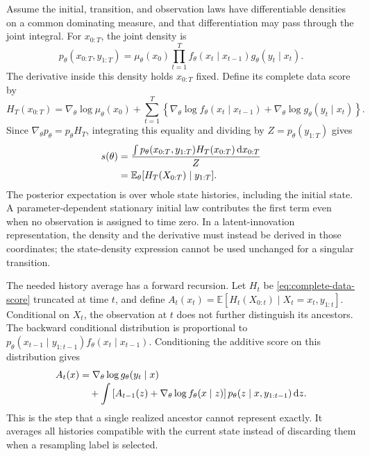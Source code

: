 \documentclass[11pt]{article}
\newcommand{\dd}{\mathrm{d}}
\begin{document}
Assume the initial, transition, and observation laws have differentiable
densities on a common dominating measure, and that differentiation may pass
through the joint integral. For $x_{0:T}$, the joint density is
\begin{equation}
 p_\theta(x_{0:T},y_{1:T})
 =\mu_\theta(x_0)\prod_{t=1}^T
       f_\theta(x_t\mid x_{t-1})g_\theta(y_t\mid x_t).
 \label{eq:joint-model-density}
\end{equation}
The derivative inside this density holds $x_{0:T}$ fixed. Define its complete
data score by
\begin{equation}
 H_T(x_{0:T})=\nabla_\theta\log\mu_\theta(x_0)
 +\sum_{t=1}^T\left\{
    \nabla_\theta\log f_\theta(x_t\mid x_{t-1})
   +\nabla_\theta\log g_\theta(y_t\mid x_t)\right\}.
 \label{eq:complete-data-score}
\end{equation}
Since $\nabla_\theta p_\theta=p_\theta H_T$, integrating this equality and
dividing by $Z=p_\theta(y_{1:T})$ gives
\begin{align}
 s(\theta)
 &=\frac{\int p_\theta(x_{0:T},y_{1:T})H_T(x_{0:T})\,\dd x_{0:T}}{Z}
 \notag\\
 &=\mathbb E_\theta[H_T(X_{0:T})\mid y_{1:T}].
 \label{eq:fisher-model-score}
\end{align}
The posterior expectation is over whole state histories, including the
initial state. A parameter-dependent stationary initial law contributes the
first term even when no observation is assigned to time zero. In a
latent-innovation representation, the density and the derivative must instead
be derived in those coordinates; the state-density expression cannot be used
unchanged for a singular transition.

The needed history average has a forward recursion. Let $H_t$ be
\eqref{eq:complete-data-score} truncated at time $t$, and define
$A_t(x_t)=\mathbb E[H_t(X_{0:t})\mid X_t=x_t,y_{1:t}]$. Conditional on
$X_t$, the observation at $t$ does not further distinguish its ancestors.
The backward conditional distribution is proportional to
$p_\theta(x_{t-1}\mid y_{1:t-1})f_\theta(x_t\mid x_{t-1})$.
Conditioning the additive score on this distribution gives
\begin{align}
 A_t(x)&=\nabla_\theta\log g_\theta(y_t\mid x)
 \notag\\[-2pt]
 &\quad+\int\left[A_{t-1}(z)
           +\nabla_\theta\log f_\theta(x\mid z)\right]
       p_\theta(z\mid x,y_{1:t-1})\,\dd z.
 \label{eq:fisher-conditional-recursion}
\end{align}
This is the step that a single realized ancestor cannot represent exactly.
It averages all histories compatible with the current state instead of
discarding them when a resampling label is selected.
\end{document}
